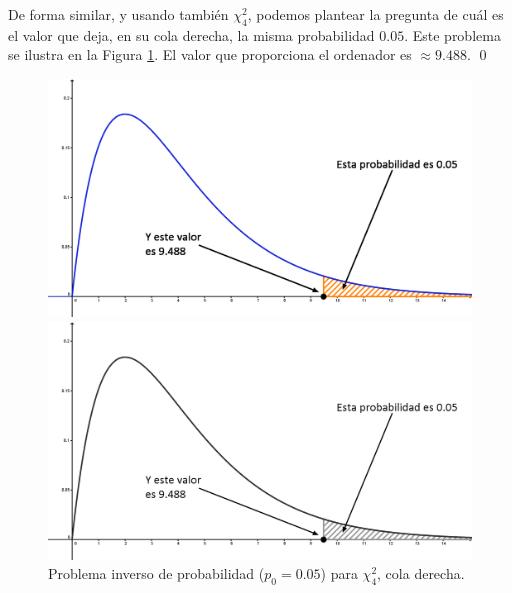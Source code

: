 \begin{ejemplo}
De forma similar, y usando también $\chi^2_4$, podemos plantear la pregunta de
cuál es el valor que deja, en su cola derecha, la misma probabilidad $0.05$.
Este problema se ilustra en la Figura
\ref{cap06:fig:ChiCuadradoProblemaInversoDerecha}. El valor que proporciona el ordenador
es $\approx 9.488$. \qed

\begin{figure}[htb]
\begin{center}
\begin{enColor}
\includegraphics[width=13cm]{../fig/Cap06-ChiCuadradoProblemaInversoDerecha.png}
\end{enColor}
\begin{bn}
\includegraphics[width=13cm]{../fig/Cap06-ChiCuadradoProblemaInversoDerecha-bn.png}
\end{bn}
\caption{Problema inverso de probabilidad ($p_0=0.05$) para $\chi^2_4$, cola derecha.}
\label{cap06:fig:ChiCuadradoProblemaInversoDerecha}
\end{center}
\end{figure}
\end{ejemplo}

